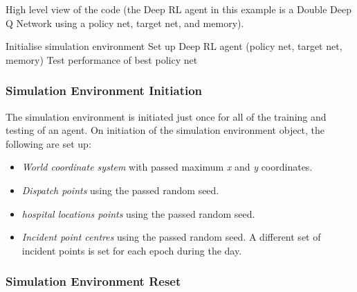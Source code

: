 \documentclass{article}
\begin{document}
\begin{algorithm}[H]
\caption{High level view of the code (the Deep RL agent in this example is a Double Deep Q Network using a policy net, target net, and memory).}
\SetAlgoLined
Initialise simulation environment\;
Set up Deep RL agent (policy net, target net, memory)\;
Test performance of best policy net\;
\label{algo:overview}    
\end{algorithm}

\subsubsection{Simulation Environment Initiation}

The simulation environment is initiated just once for all of the training and testing of an agent. On initiation of the simulation environment object, the following are set up:

\begin{itemize}

    \item \emph{World coordinate system} with passed maximum \emph{x} and \emph{y} coordinates.

    \item \emph{Dispatch points} using the passed random seed.
    
    \item \emph{hospital locations points} using the passed random seed.
    
    \item \emph{Incident point centres} using the passed random seed. A different set of incident points is set for each epoch during the day.
    
\end{itemize}

\subsubsection{Simulation Environment Reset}
\end{document}
